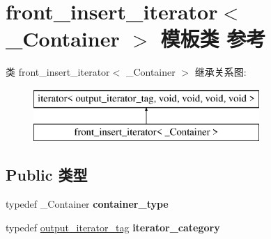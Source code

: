 \hypertarget{classfront__insert__iterator}{}\section{front\+\_\+insert\+\_\+iterator$<$ \+\_\+\+Container $>$ 模板类 参考}
\label{classfront__insert__iterator}
类 front\+\_\+insert\+\_\+iterator$<$ \+\_\+\+Container $>$ 继承关系图\+:\begin{figure}[H]
\begin{center}
\leavevmode
\includegraphics[height=2.000000cm]{classfront__insert__iterator}
\end{center}
\end{figure}
\subsection*{Public 类型}
\begin{DoxyCompactItemize}
\item 
\mbox{\label{classfront__insert__iterator_a6c4a725c30cc4f0daa9f6da16753530b}} 
typedef \+\_\+\+Container {\bfseries container\+\_\+type}
\item 
\mbox{\label{classfront__insert__iterator_a628f2995c1aca2d3a52a42ffbffb8702}} 
typedef \hyperlink{structoutput__iterator__tag}{output\+\_\+iterator\+\_\+tag} {\bfseries iterator\+\_\+category}
\end{DoxyCompactItemize}
